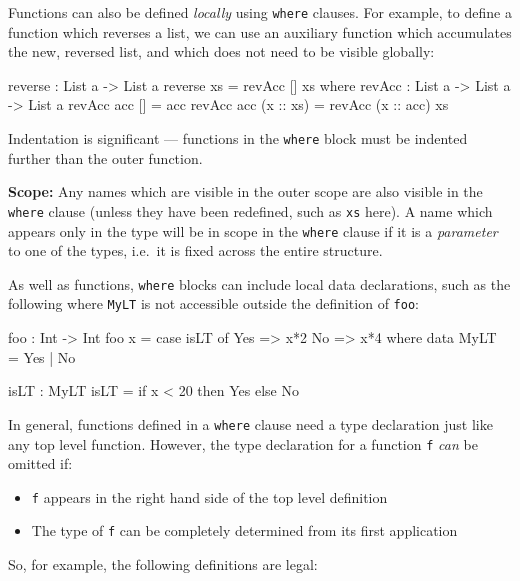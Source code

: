 Functions can also be defined \emph{locally} using \texttt{where} clauses.
For example, to define a function which reverses a list, we can use an auxiliary function which accumulates the new, reversed list, and which does not need to be visible globally:

\begin{code}
reverse : List a -> List a
reverse xs = revAcc [] xs where
  revAcc : List a -> List a -> List a
  revAcc acc [] = acc
  revAcc acc (x :: xs) = revAcc (x :: acc) xs
\end{code}

\noindent
Indentation is significant --- functions in the \texttt{where} block must be indented further than the outer function.

\textbf{Scope:} 
Any names which are visible in the outer scope are also visible in the \texttt{where} clause (unless they have been redefined, such as \texttt{xs} here).
A name which appears only in the type will be in scope in the \texttt{where} clause if it is a \emph{parameter} to one of the types, i.e.\ it is fixed across the entire structure. 

As well as functions, \texttt{where} blocks can include local data declarations, such as the following where \texttt{MyLT} is not accessible outside the definition of \texttt{foo}:

\begin{code}
foo : Int -> Int
foo x = case isLT of
            Yes => x*2
            No => x*4
    where
       data MyLT = Yes | No

       isLT : MyLT
       isLT = if x < 20 then Yes else No
\end{code}

\noindent
In general, functions defined in a \texttt{where} clause need a type declaration just like any top level function.
However, the type declaration for a function \texttt{f} \emph{can} be omitted if:

\begin{itemize}
\item \texttt{f} appears in the right hand side of the top level definition 
\item The type of \texttt{f} can be completely determined from its first application
\end{itemize}

\noindent
So, for example, the following definitions are legal:


